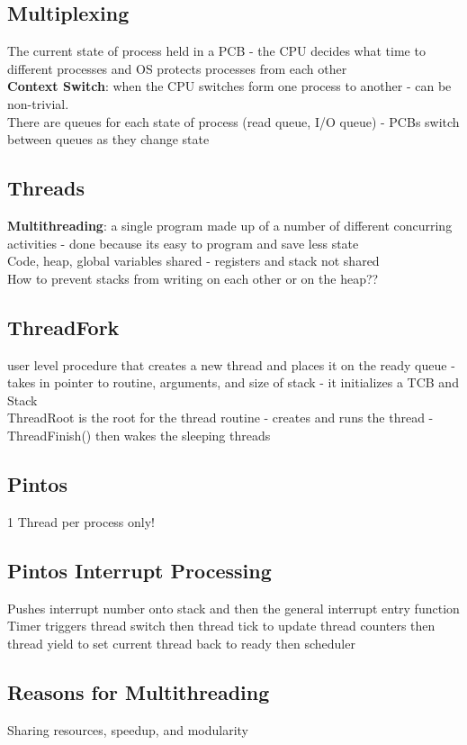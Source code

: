 \documentclass{article}
\begin{document}
\subsection{Multiplexing}
The current state of process held in a PCB - the CPU decides what time to different processes and OS protects processes from each other \\
\textbf{Context Switch}: when the CPU switches form one process to another - can be non-trivial. \\
There are queues for each state of process (read queue, I/O queue) - PCBs switch between queues as they change state \\
\subsection{Threads}
\textbf{Multithreading}: a single program made up of a number of different concurring activities - done because its easy to program and save less state \\
Code, heap, global variables shared - registers and stack not shared \\
How to prevent stacks from writing on each other or on the heap??
\subsection{ThreadFork}
user level procedure that creates a new thread and places it on the ready queue - takes in pointer to routine, arguments, and size of stack - it initializes a TCB and Stack \\
ThreadRoot is the root for the thread routine - creates and runs the thread - ThreadFinish() then wakes the sleeping threads
\subsection{Pintos}
1 Thread per process only!
\subsection{Pintos Interrupt Processing}
Pushes interrupt number onto stack and then the general interrupt entry function \\
Timer triggers thread switch then thread tick to update thread counters then thread yield to set current thread back to ready then scheduler
\subsection{Reasons for Multithreading}
Sharing resources, speedup, and modularity
\end{document}
